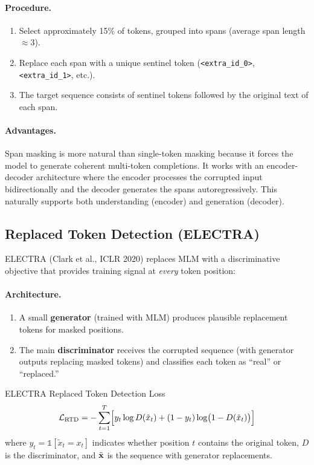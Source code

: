 \paragraph{Procedure.}
\begin{enumerate}
    \item Select approximately 15\% of tokens, grouped into spans (average
          span length $\approx 3$).
    \item Replace each span with a unique sentinel token (\texttt{<extra\_id\_0>},
          \texttt{<extra\_id\_1>}, etc.).
    \item The target sequence consists of sentinel tokens followed by the
          original text of each span.
\end{enumerate}

\paragraph{Advantages.}
Span masking is more natural than single-token masking because it forces the
model to generate coherent multi-token completions.  It works with an
encoder-decoder architecture where the encoder processes the corrupted input
bidirectionally and the decoder generates the spans autoregressively.  This
naturally supports both understanding (encoder) and generation (decoder).

\subsection{Replaced Token Detection (ELECTRA)}

ELECTRA (Clark et al., ICLR 2020) replaces MLM with a discriminative objective
that provides training signal at \emph{every} token position:

\paragraph{Architecture.}
\begin{enumerate}
    \item A small \textbf{generator} (trained with MLM) produces plausible
          replacement tokens for masked positions.
    \item The main \textbf{discriminator} receives the corrupted sequence
          (with generator outputs replacing masked tokens) and classifies
          each token as ``real'' or ``replaced.''
\end{enumerate}

\begin{mathresult}{ELECTRA Replaced Token Detection Loss}
\[
    \mathcal{L}_{\text{RTD}} = - \sum_{t=1}^{T} \Bigl[
        y_t \log D(\tilde{x}_t) + (1 - y_t) \log\bigl(1 - D(\tilde{x}_t)\bigr)
    \Bigr]
\]
where $y_t = \mathds{1}[\tilde{x}_t = x_t]$ indicates whether position $t$ contains
the original token, $D$ is the discriminator, and $\tilde{\mathbf{x}}$ is the sequence with
generator replacements.
\end{mathresult}

